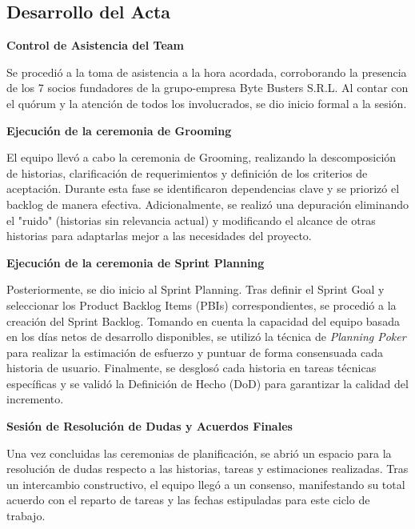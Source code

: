 \newpage
\subsection{Desarrollo del Acta}

\noindent \textbf{Control de Asistencia del Team}\par
Se procedió a la toma de asistencia a la hora acordada, corroborando la presencia de los 7 socios fundadores de la grupo-empresa Byte Busters S.R.L. Al contar con el quórum y la atención de todos los involucrados, se dio inicio formal a la sesión.

\vspace*{0.5cm}
\noindent \textbf{Ejecución de la ceremonia de Grooming}\par
El equipo llevó a cabo la ceremonia de Grooming, realizando la descomposición de historias, clarificación de requerimientos y definición de los criterios de aceptación. Durante esta fase se identificaron dependencias clave y se priorizó el backlog de manera efectiva. Adicionalmente, se realizó una depuración eliminando el "ruido" (historias sin relevancia actual) y modificando el alcance de otras historias para adaptarlas mejor a las necesidades del proyecto.

\vspace*{0.5cm}
\noindent \textbf{Ejecución de la ceremonia de Sprint Planning}\par
Posteriormente, se dio inicio al Sprint Planning. Tras definir el Sprint Goal y seleccionar los Product Backlog Items (PBIs) correspondientes, se procedió a la creación del Sprint Backlog. Tomando en cuenta la capacidad del equipo basada en los días netos de desarrollo disponibles, se utilizó la técnica de \textit{Planning Poker} para realizar la estimación de esfuerzo y puntuar de forma consensuada cada historia de usuario. Finalmente, se desglosó cada historia en tareas técnicas específicas y se validó la Definición de Hecho (DoD) para garantizar la calidad del incremento.

\vspace*{0.5cm}
\noindent \textbf{Sesión de Resolución de Dudas y Acuerdos Finales}\par
Una vez concluidas las ceremonias de planificación, se abrió un espacio para la resolución de dudas respecto a las historias, tareas y estimaciones realizadas. Tras un intercambio constructivo, el equipo llegó a un consenso, manifestando su total acuerdo con el reparto de tareas y las fechas estipuladas para este ciclo de trabajo.

